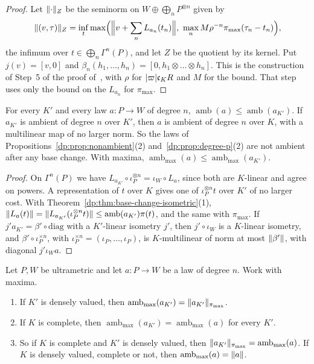 \begin{proof}
Let $\lVert \cdot\rVert_Z$ be the seminorm on $W\oplus\bigoplus_nP^{\otimes n}$ given by
\[
 \norm{(v,\tau)}_Z=\inf_t\max\Bigl(\Bigl\lVert v+\sum_nL_{a_n}(t_n)\Bigr\rVert,\ \max_nM\rho^{-n}\pi_{\max}(\tau_n-t_n)\Bigr),
\]
the infimum over $t\in\bigoplus_n\Gamma^n(P)$, and let $Z$ be the quotient by its kernel. Put $j(v)=[v,0]$ and $\beta_n(h_1,\dots,h_n)=[0,h_1\otimes\dots\otimes h_n]$. This is the construction of Step~5 of the proof of~\cite[Theorem~14.39]{I}, with $\rho$ for $\lvert \varpi\rvert\mathfrak c_KR$ and $M$ for the bound. That step uses only the bound on the $L_{a_n}$ for $\pi_{\max}$.
\end{proof}

\begin{proposition}\label{dp:prop:nonambient-base}
For every $K'$ and every law $a\colon P\to W$ of degree $n$, $\operatorname{amb}(a)\le\operatorname{amb}(a_{K'})$. If $a_{K'}$ is ambient of degree $n$ over $K'$, then $a$ is ambient of degree $n$ over $K$, with a multilinear map of no larger norm. So the laws of Propositions~\ref{dp:prop:nonambient}\textup{(2)} and~\ref{dp:prop:degree-p}\textup{(2)} are not ambient after any base change. With maxima, $\operatorname{amb}_{\max}(a)\le\operatorname{amb}_{\max}(a_{K'})$.
\end{proposition}

\begin{proof}
On $\Gamma^n(P)$ we have $L_{a_{K'}}\circ\iota_P^{\otimes n}=\iota_W\circ L_a$, since both are $K$-linear and agree on powers. A representation of $t$ over $K$ gives one of $\iota_P^{\otimes n}t$ over $K'$ of no larger cost. With Theorem~\ref{dp:thm:base-change-isometric}(1), $\lVert L_a(t)\rVert=\lVert L_{a_{K'}}(\iota_P^{\otimes n}t)\rVert\le\operatorname{amb}(a_{K'})\pi(t)$, and the same with $\pi_{\max}$. If $j'a_{K'}=\beta'\circ\mathrm{diag}$ with a $K'$-linear isometry $j'$, then $j'\circ\iota_W$ is a $K$-linear isometry, and $\beta'\circ\iota_P^{\times n}$, with $\iota_P^{\times n}=(\iota_P,\dots,\iota_P)$, is $K$-multilinear of norm at most $\lVert \beta'\rVert$, with diagonal $j'\iota_Wa$.
\end{proof}

\begin{theorem}\label{dp:thm:base-change-amb}
Let $P,W$ be ultrametric and let $a\colon P\to W$ be a law of degree $n$. Work with maxima.
\begin{enumerate}
\item If $K'$ is densely valued, then $\operatorname{amb}_{\max}(a_{K'})=\lVert a_{K'}\rVert_{\pi_{\max}}$.
\item If $K$ is complete, then $\operatorname{amb}_{\max}(a_{K'})=\operatorname{amb}_{\max}(a)$ for every $K'$.
\item So if $K$ is complete and $K'$ is densely valued, then $\lVert a_{K'}\rVert_{\pi_{\max}}=\operatorname{amb}_{\max}(a)$. If $K$ is densely valued, complete or not, then $\operatorname{amb}_{\max}(a)=\lVert a\rVert$.
\end{enumerate}
\end{theorem}

